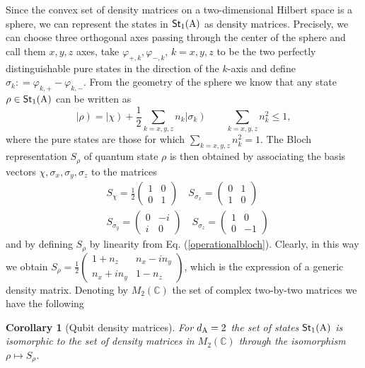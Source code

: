 \documentclass[12pt,aps,pra,showpacs,groupedaddress]{revtex4-1}
\newtheorem{corollary}{Corollary} \newtheorem{theorem}{Theorem}
\def\Cmplx{\mathbb C}
\def\Stset{{\mathsf{St}}}
\def\K#1{\left|#1\right)}  \def\B#1{\left(#1\right|}
\begin{document}
Since the convex set of density matrices on a two-dimensional Hilbert space is a sphere, we can
represent the states in $\Stset_1(\rA)$ as density matrices.  Precisely, we can choose three
orthogonal axes passing through the center of the sphere and call them $x,y,z$ axes, take
$\varphi_{+, k}, \varphi_{-,k}$, $k=x,y,z$ to be the two perfectly distinguishable pure states in
the direction of the $k$-axis and define $\sigma_k : = \varphi_{k,+} - \varphi_{k,-}$.  From the
geometry of the sphere we know that any state $\rho \in\Stset_1(\rA)$ can be written as
\begin{equation}\label{operationalbloch}
\K\rho = \K \chi  +  \frac 12  \sum_{k=x,y,z}  n_k  \K {\sigma_k}  \qquad \sum_{k=x,y,z}  n_k^2 \le 1,
\end{equation}
where the pure states are those for which $\sum_{k=x,y,z} n_k^2 =1$.  The Bloch representation $S_\rho$  of
quantum state $\rho$  is then obtained by associating the basis vectors $\chi, \sigma_x, \sigma_y,
\sigma_z$ to the matrices
\begin{align*}
\nonumber &S_\chi = \frac 12 \begin{pmatrix}   1 & 0 \\0&1  \end{pmatrix} \quad S_{\sigma_x} =  \begin{pmatrix}   0 & 1 \\1&0  \end{pmatrix}  \\  
 \label{mappalinearestates}
 &S_{\sigma_y} =  \begin{pmatrix}   0 & -i \\i &0  \end{pmatrix} \quad S_{\sigma_z} =  \begin{pmatrix}   1 & 0 \\0&-1  \end{pmatrix}
 \end{align*}
 and by defining $S_\rho$ by linearity from Eq. (\ref{operationalbloch}).  Clearly, in this way we
 obtain $S_\rho = \frac 12 \begin{pmatrix} 1 + n_z & n_x-in_y \\ n_x + i n_y & 1-n_z \end{pmatrix}$,
 which is the expression of a generic density matrix. Denoting by $M_2 (\Cmplx)$ the set of complex
 two-by-two matrices we have the following
\begin{corollary}[Qubit density matrices]
For  $d_{\rm A} = 2$ the set of states $\Stset_1 (\rA)$ is isomorphic to the set of density matrices in $M_{2} (\Cmplx)$ through the isomorphism $\rho  \mapsto S_\rho$.   
\end{corollary}
\end{document}
